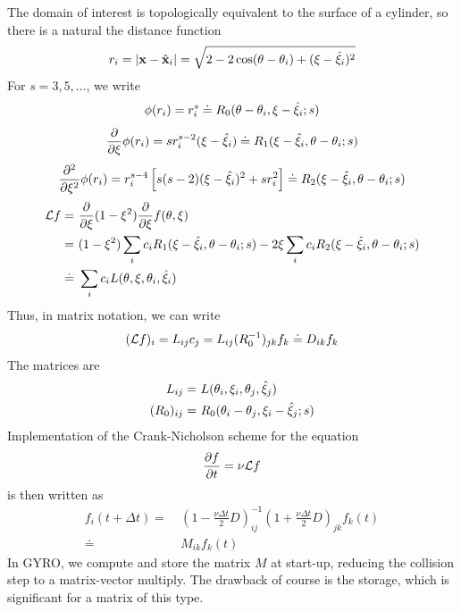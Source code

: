 The domain of interest is topologically equivalent to 
the surface of a cylinder, so there is a natural the 
distance function 
%
\begin{equation}
r_i = |{\bf x}-{\hat {\bf x}}_i| = \sqrt{2-2\cos(\theta-\theta_i)+(\xi-{\hat\xi}_i)^2}
\end{equation}
%
For $s=3,5,\ldots$, we write
%
\begin{equation}
\phi(r_i) = r_i^s \doteq R_0(\theta-\theta_i,\xi-{\hat\xi}_i;s) 
\end{equation}
%
\begin{equation}
\frac{\partial}{\partial\xi} \phi(r_i) 
 = s r_i^{s-2} (\xi-{\hat\xi}_i) 
\doteq R_1(\xi-{\hat\xi}_i,\theta-\theta_i;s)
\end{equation}
%
\begin{equation}
\frac{\partial^2}{\partial\xi^2} \phi(r_i) 
 = r_i^{s-4} \left[ s(s-2)(\xi-{\hat\xi}_i)^2 + s r_i^2 \right] 
\doteq R_2(\xi-{\hat\xi}_i,\theta-\theta_i;s)
\end{equation}
%
\begin{align}
{\cal L} f = &~\frac{\partial}{\partial\xi} (1-\xi^2)
\frac{\partial}{\partial \xi} f(\theta,\xi) \\
= &~(1-\xi^2) \sum_i c_i R_1(\xi-{\hat\xi}_i,\theta-\theta_i;s) 
- 2\xi \sum_i c_i R_2(\xi-{\hat\xi}_i,\theta-\theta_i;s) \\
\doteq &~\sum_i c_i L(\theta,\xi,\theta_i,{\hat\xi}_i)
\end{align}
%
Thus, in matrix notation, we can write
%
\begin{equation}
({\cal L} f)_i = L_{ij} c_j = L_{ij} (R_0^{-1})_{jk} f_k \doteq D_{ik} f_k
\end{equation}
%
The matrices are
%
\begin{align}
L_{ij} = &~L(\theta_i,\xi_i,\theta_j,{\hat\xi}_j) \\
(R_0)_{ij} = &~R_0(\theta_i-\theta_j,\xi_i-{\hat\xi}_j;s)
\end{align}
%
Implementation of the Crank-Nicholson scheme for the equation
%
\begin{equation}
\frac{\partial f}{\partial t} = \nu {\cal L} f
\end{equation}
%
is then written as
%
\begin{align}
f_i(t+\Delta t) = &~\left( 1-\frac{\nu \Delta t}{2} D \right)_{ij}^{-1}
\left( 1+\frac{\nu \Delta t}{2} D \right)_{jk} f_k(t) \\
\doteq &~M_{ik} f_k(t)
\end{align}
%
In GYRO, we compute and store the matrix $M$ at start-up,
reducing the collision step to a matrix-vector multiply.
The drawback of course is the storage, which is significant
for a matrix of this type.

